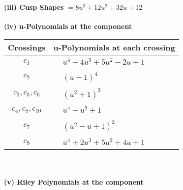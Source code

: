 \documentclass[1p]{elsarticle_modified}
\theoremstyle{definition}
\begin{document}
\flushleft \textbf{(iii) Cusp Shapes $= 8 u^3+12 u^2+32 u+12$}\\~\\
\newpage\renewcommand{\arraystretch}{1}
\flushleft \textbf{(iv) u-Polynomials at the component}\newline \\
\begin{tabular}{m{50pt}|m{274pt}}
Crossings & \hspace{64pt}u-Polynomials at each crossing \\
\hline $$\begin{aligned}c_{1}\end{aligned}$$&$\begin{aligned}
&u^4-4 u^3+5 u^2-2 u+1
\end{aligned}$\\
\hline $$\begin{aligned}c_{2}\end{aligned}$$&$\begin{aligned}
&(u-1)^4
\end{aligned}$\\
\hline $$\begin{aligned}c_{3},c_{5},c_{6}\end{aligned}$$&$\begin{aligned}
&(u^2+1)^2
\end{aligned}$\\
\hline $$\begin{aligned}c_{4},c_{8},c_{10}\end{aligned}$$&$\begin{aligned}
&u^4- u^2+1
\end{aligned}$\\
\hline $$\begin{aligned}c_{7}\end{aligned}$$&$\begin{aligned}
&(u^2- u+1)^2
\end{aligned}$\\
\hline $$\begin{aligned}c_{9}\end{aligned}$$&$\begin{aligned}
&u^4+2 u^3+5 u^2+4 u+1
\end{aligned}$\\
\hline
\end{tabular}\\~\\
\newpage\renewcommand{\arraystretch}{1}
\flushleft \textbf{(v) Riley Polynomials at the component}\newline \\
\end{document}
